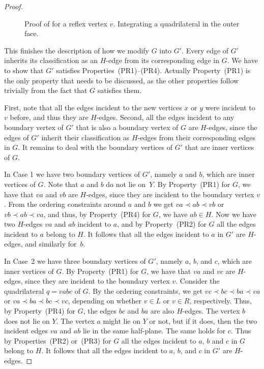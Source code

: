 \begin{proof}
	\begin{figure}
		\caption{Proof of  for a reflex
			vertex $v$. Integrating a quadrilateral in the outer face.}
	\end{figure}
	
	
	
	This finishes the description of how we modify $G$ into $G'$. Every edge of $G'$ inherits its classification as an $H$-edge from its corresponding edge in $G$. We have to show that $G'$ satisfies Properties~(PR1)--(PR4). Actually Property~(PR1) is the only property that needs to be discussed, as the other properties follow trivially from the fact that $G$ satisfies them. 
%	
%	
	
	First, note that all the edges incident to the new vertices $x$ or $y$ were incident to $v$
	before, and thus they are $H$-edges. Second, all the edges incident to any boundary vertex of $G'$ that is also a boundary vertex of $G$ are $H$-edges, since the edges of $G'$ inherit their classification as $H$-edges from their corresponding edges in $G$. It remains to deal with the boundary vertices of $G'$ that are inner vertices of $G$.  
	
	In Case 1 we have two boundary vertices of $G'$, namely $a$ and $b$, which are inner vertices of $G$. Note that $a$ and $b$ do not lie on~$Y$. By Property~(PR1) for $G$, we have that $va$ and $vb$ are $H$-edges, since they are incident to the boundary vertex $v$. From the ordering constraints around $a$ and $b$ we get $va\prec ab\prec vb$
	or
	$vb\prec ab\prec va$, and thus, by Property~(PR4) for $G$, we have $ab\in H$.
	Now we have two $H$-edges $va$ and $ab$ incident to $a$,
	and by Property~(PR2) for $G$ all the edges incident
	to $a$ belong to $H$. It follows that all the edges incident to $a$ in $G'$ are $H$-edges, and similarly for~$b$.
	
	In Case~2 we have three boundary vertices of $G'$, namely $a$, $b$, and $c$, which are inner vertices of $G$. By Property~(PR1) for $G$, we have that $va$ and $vc$ are $H$-edges, since they are incident to the boundary vertex $v$. Consider the quadrilateral $q=vabc$ of $G$. By the ordering constraints, we get
	$vc \prec bc\prec ba\prec va$ or $va \prec ba\prec bc\prec vc$,
	depending on whether $v\in L$ or $v\in R$, respectively. Thus, by Property~(PR4) for $G$, the edges $bc$ and $ba$ are also $H$-edges. The vertex $b$ does not lie on $Y$. The vertex $a$ might lie on $Y$ or not, but if it does, then the two incident edges $va$ and $ab$ lie in the same half-plane.
	The same holds for $c$. Thus by Properties~(PR2) or~(PR3) for $G$ all the edges incident
	to $a$, $b$ and $c$ in $G$ belong to $H$. It follows that all the edges incident to $a$, $b$, and $c$ in $G'$ are $H$-edges.
	

\end{proof}
